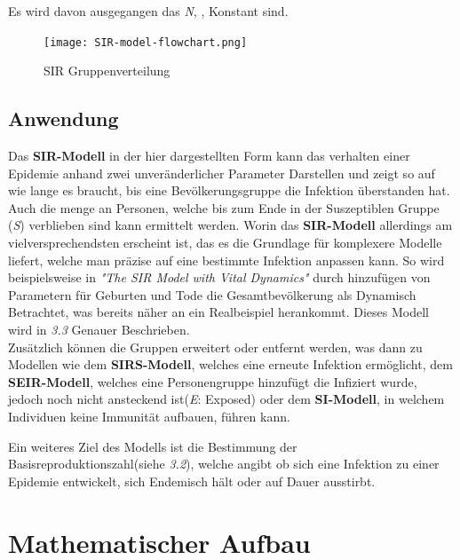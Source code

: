 \documentclass[12pt]{scrartcl} %
\begin{document}
Es wird davon ausgegangen das \textit{N}, \textbeta, \textgamma \space Konstant sind.

	\begin{figure}[h]
	\centering
	\texttt{[image: SIR-model-flowchart.png]} 
	\caption{SIR Gruppenverteilung}
	\end{figure}


\subsection{Anwendung}

Das \textbf{SIR-Modell} in der hier dargestellten Form kann das verhalten einer Epidemie anhand zwei unveränderlicher Parameter Darstellen und zeigt so auf wie lange es braucht, bis eine Bevölkerungsgruppe die Infektion überstanden hat. Auch die menge an Personen, welche bis zum Ende in der Suszeptiblen Gruppe (\textit{S}) verblieben sind kann ermittelt werden. 
Worin das \textbf{SIR-Modell} allerdings am vielversprechendsten erscheint ist, das es die Grundlage für komplexere Modelle liefert, welche man präzise auf eine bestimmte Infektion anpassen kann.
So wird beispielsweise in \textsl{"The SIR Model with Vital Dynamics"} \cite[s. 132]{5} durch hinzufügen von Parametern für Geburten und Tode die Gesamtbevölkerung als Dynamisch Betrachtet, was bereits näher an ein Realbeispiel herankommt.
Dieses Modell wird in \textsl{3.3} Genauer Beschrieben.\\
Zusätzlich können die Gruppen erweitert oder entfernt werden, was dann zu Modellen wie dem 
\textbf{SIRS-Modell}, welches eine erneute Infektion ermöglicht, dem \textbf{SEIR-Modell}, welches eine Personengruppe hinzufügt die Infiziert wurde, jedoch noch nicht ansteckend ist(\textit{E}: Exposed) oder dem \textbf{SI-Modell}, in welchem Individuen keine Immunität aufbauen, führen kann.

Ein weiteres Ziel des Modells ist die Bestimmung der Basisreproduktionszahl(siehe \textsl{3.2}), welche angibt ob sich eine Infektion zu einer Epidemie entwickelt, sich Endemisch hält oder auf Dauer ausstirbt. \cite[vgl.]{2}

\newpage
\section{Mathematischer Aufbau}
\end{document}
